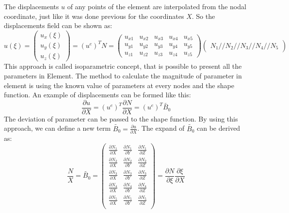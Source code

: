 The displacements $u$ of any points of the element are interpolated from the nodal coordinate, just like it was done previous for the coordinates $X$. So the displacements field can be shown as:
\begin{equation}
u\left(\xi\right) = \begin{pmatrix}
u_x\left(\xi\right) \\
u_y\left(\xi\right) \\
u_z\left(\xi\right) 
\end{pmatrix} = \left(u^e\right)^T N = \begin{pmatrix}
u_{x1} & u_{x2} & u_{x3} & u_{x4} & u_{x5} \\
u_{y1} & u_{y2} & u_{y3} & u_{y4} & u_{y5} \\
u_{z1} & u_{z2} & u_{z3} & u_{z4} & u_{z5}
\end{pmatrix} \begin{pmatrix}
N_1 //
N_2 //
N_3 //
N_4 //
N_5 
\end{pmatrix}
\end{equation}
This approach is called isoparametric concept, that is possible to present all the parameters in Element. The method to calculate the magnitude of parameter in element is using the known value of parameters at every nodes and the shape function. An example of displacements can be formed like this:
\begin{equation}
\frac{\partial u}{\partial X} = \left(u^e\right)^T \frac{\partial N}{\partial X} = \left(u^e\right)^T \tilde{B_0}
\end{equation}
The deviation of parameter can be passed to the shape function. By using this approach, we can define a new term $\tilde{B_0} = \frac{\partial u}{\partial X}$. The expand of $\tilde{B_0}$ can be derived as:
\begin{equation} \label{eq: B_0}
\frac{N}{X} = \tilde{B_0} = \begin{pmatrix}
\frac{\partial N_1}{\partial X} & \frac{\partial N_1}{\partial Y} & \frac{\partial N_1}{\partial Z} \\
\frac{\partial N_2}{\partial X} & \frac{\partial N_2}{\partial Y} & \frac{\partial N_2}{\partial Z} \\
\frac{\partial N_3}{\partial X} & \frac{\partial N_3}{\partial Y} & \frac{\partial N_3}{\partial Z} \\
\frac{\partial N_4}{\partial X} & \frac{\partial N_4}{\partial Y} & \frac{\partial N_4}{\partial Z} \\
\frac{\partial N_5}{\partial X} & \frac{\partial N_5}{\partial Y} & \frac{\partial N_5}{\partial Z} \\
\end{pmatrix} = \frac{\partial N}{\partial \xi} \frac{\partial \xi}{\partial X}
\end{equation}

